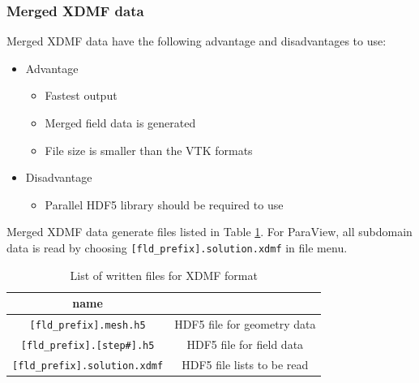 \subsubsection{Merged XDMF data}
Merged XDMF data have the following advantage and disadvantages to use:
%
\begin{itemize}
\item Advantage
\begin{itemize} 
\item Fastest output
\item Merged field data is generated
\item File size is smaller than the VTK formats
\end{itemize}
\item Disadvantage
\begin{itemize} 
\item Parallel HDF5 library should be required to use
\end{itemize}
\end{itemize}
%
Merged XDMF data generate files listed in Table \ref{table:XDMF}. For ParaView, all subdomain data is read by choosing \verb|[fld_prefix].solution.xdmf| in file menu.
%
\begin{table}[htp]
\caption{List of written files for XDMF format}
\begin{center} 
\begin{tabular}{|c|c|}
\hline
 name &  \\ \hline \hline
\verb|[fld_prefix].mesh.h5|  & HDF5 file for geometry data \\ \hline
\verb|[fld_prefix].[step#].h5|  &HDF5 file for field data   \\ \hline
\verb|[fld_prefix].solution.xdmf|  & HDF5 file lists to be read  \\ \hline
\end{tabular}
\end{center}
\label{table:XDMF}
\end{table}
%


